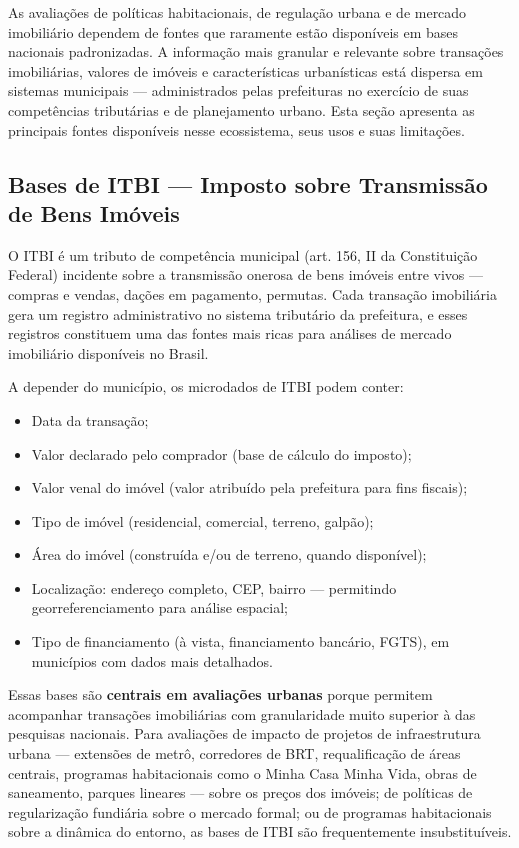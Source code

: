 As avaliações de políticas habitacionais, de regulação urbana e de mercado imobiliário dependem de fontes que raramente estão disponíveis em bases nacionais padronizadas. A informação mais granular e relevante sobre transações imobiliárias, valores de imóveis e características urbanísticas está dispersa em sistemas municipais --- administrados pelas prefeituras no exercício de suas competências tributárias e de planejamento urbano. Esta seção apresenta as principais fontes disponíveis nesse ecossistema, seus usos e suas limitações.

\subsection{Bases de ITBI --- Imposto sobre Transmissão de Bens Imóveis}

O ITBI é um tributo de competência municipal (art. 156, II da Constituição Federal) incidente sobre a transmissão onerosa de bens imóveis entre vivos --- compras e vendas, dações em pagamento, permutas. Cada transação imobiliária gera um registro administrativo no sistema tributário da prefeitura, e esses registros constituem uma das fontes mais ricas para análises de mercado imobiliário disponíveis no Brasil.

A depender do município, os microdados de ITBI podem conter:

\begin{itemize}
  \item Data da transação;
  \item Valor declarado pelo comprador (base de cálculo do imposto);
  \item Valor venal do imóvel (valor atribuído pela prefeitura para fins fiscais);
  \item Tipo de imóvel (residencial, comercial, terreno, galpão);
  \item Área do imóvel (construída e/ou de terreno, quando disponível);
  \item Localização: endereço completo, CEP, bairro --- permitindo georreferenciamento para análise espacial;
  \item Tipo de financiamento (à vista, financiamento bancário, FGTS), em municípios com dados mais detalhados.
\end{itemize}

Essas bases são \textbf{centrais em avaliações urbanas} porque permitem acompanhar transações imobiliárias com granularidade muito superior à das pesquisas nacionais. Para avaliações de impacto de projetos de infraestrutura urbana --- extensões de metrô, corredores de BRT, requalificação de áreas centrais, programas habitacionais como o Minha Casa Minha Vida, obras de saneamento, parques lineares --- sobre os preços dos imóveis; de políticas de regularização fundiária sobre o mercado formal; ou de programas habitacionais sobre a dinâmica do entorno, as bases de ITBI são frequentemente insubstituíveis.

